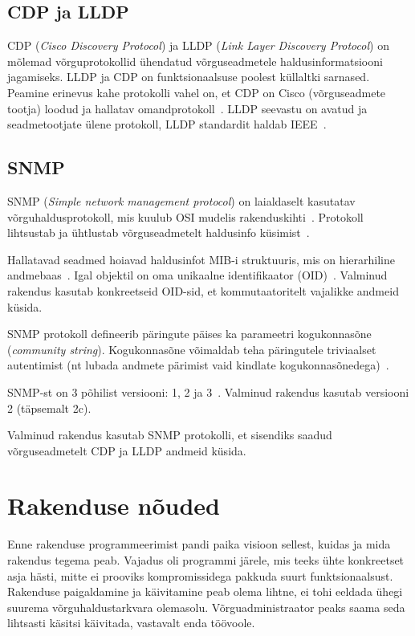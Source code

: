 \documentclass[12pt]{article}
\begin{document}
\subsection{CDP ja LLDP}
CDP (\textit{Cisco Discovery Protocol}) ja LLDP (\textit{Link Layer Discovery Protocol}) on
mõlemad võrguprotokollid ühendatud võrguseadmetele haldusinformatsiooni jagamiseks.
LLDP ja CDP on funktsionaalsuse poolest küllaltki sarnased.
Peamine erinevus kahe protokolli vahel on, et CDP on Cisco (võrguseadmete tootja)
loodud ja hallatav omandprotokoll~\cite{cdpInfo}.
LLDP seevastu on avatud ja seadmetootjate ülene protokoll, LLDP standardit haldab
IEEE~\cite{lldpInfo}.

\subsection{SNMP} \label{subsec:snmp}
SNMP (\textit{Simple network management protocol}) on laialdaselt kasutatav
võrguhaldusprotokoll, mis kuulub OSI mudelis rakenduskihti~\cite[151]{sissejuhVorg}.
Protokoll lihtsustab ja ühtlustab võrguseadmetelt haldusinfo küsimist~\cite[151]{sissejuhVorg}.

Hallatavad seadmed hoiavad haldusinfot MIB-i struktuuris, mis on hierarhiline andmebaas~\cite[152]{sissejuhVorg}.
Igal objektil on oma unikaalne identifikaator (OID)~\cite[152]{sissejuhVorg}.
Valminud rakendus kasutab konkreetseid OID-sid, et kommutaatoritelt vajalikke andmeid küsida.

SNMP protokoll defineerib päringute päises ka parameetri kogukonnasõne (\textit{community string}).
Kogukonnasõne võimaldab teha päringutele triviaalset autentimist (nt lubada andmete pärimist
vaid kindlate kogukonnasõnedega)~\cite[154-155]{sissejuhVorg}.

SNMP-st on 3 põhilist versiooni: 1, 2 ja 3~\cite[151]{sissejuhVorg}.
Valminud rakendus kasutab versiooni 2 (täpsemalt 2c).

Valminud rakendus kasutab SNMP protokolli, et sisendiks saadud võrguseadmetelt CDP ja LLDP
andmeid küsida.


\newpage
\section{Rakenduse nõuded} \label{reqs}
Enne rakenduse programmeerimist pandi paika visioon sellest, kuidas ja mida rakendus tegema peab.
Vajadus oli programmi järele, mis teeks ühte konkreetset asja hästi, mitte ei prooviks
kompromissidega pakkuda suurt funktsionaalsust.
Rakenduse paigaldamine ja käivitamine peab olema lihtne, ei tohi eeldada ühegi suurema
võrguhaldustarkvara olemasolu.
Võrguadministraator peaks saama seda lihtsasti käsitsi käivitada, vastavalt enda töövoole.
\end{document}
